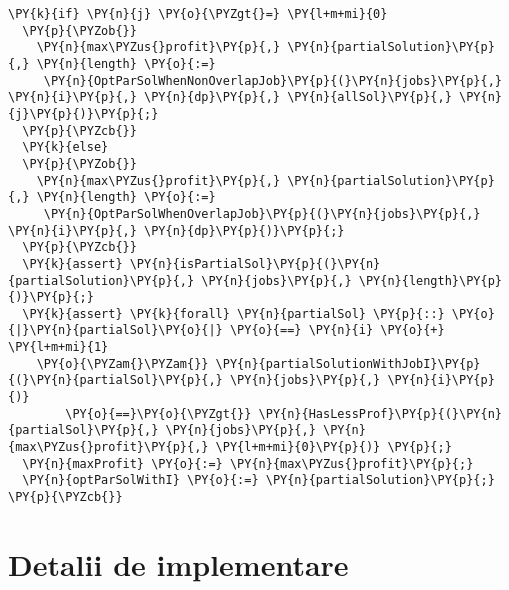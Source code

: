 \begin{Verbatim}[commandchars=\\\{\}, fontsize=\small]
  \PY{k}{if} \PY{n}{j} \PY{o}{\PYZgt{}=} \PY{l+m+mi}{0} 
  \PY{p}{\PYZob{}}
    \PY{n}{max\PYZus{}profit}\PY{p}{,} \PY{n}{partialSolution}\PY{p}{,} \PY{n}{length} \PY{o}{:=}
     \PY{n}{OptParSolWhenNonOverlapJob}\PY{p}{(}\PY{n}{jobs}\PY{p}{,} \PY{n}{i}\PY{p}{,} \PY{n}{dp}\PY{p}{,} \PY{n}{allSol}\PY{p}{,} \PY{n}{j}\PY{p}{)}\PY{p}{;}
  \PY{p}{\PYZcb{}}
  \PY{k}{else}
  \PY{p}{\PYZob{}}
    \PY{n}{max\PYZus{}profit}\PY{p}{,} \PY{n}{partialSolution}\PY{p}{,} \PY{n}{length} \PY{o}{:=}
     \PY{n}{OptParSolWhenOverlapJob}\PY{p}{(}\PY{n}{jobs}\PY{p}{,} \PY{n}{i}\PY{p}{,} \PY{n}{dp}\PY{p}{)}\PY{p}{;}
  \PY{p}{\PYZcb{}}
  \PY{k}{assert} \PY{n}{isPartialSol}\PY{p}{(}\PY{n}{partialSolution}\PY{p}{,} \PY{n}{jobs}\PY{p}{,} \PY{n}{length}\PY{p}{)}\PY{p}{;}
  \PY{k}{assert} \PY{k}{forall} \PY{n}{partialSol} \PY{p}{::} \PY{o}{|}\PY{n}{partialSol}\PY{o}{|} \PY{o}{==} \PY{n}{i} \PY{o}{+} \PY{l+m+mi}{1} 
    \PY{o}{\PYZam{}\PYZam{}} \PY{n}{partialSolutionWithJobI}\PY{p}{(}\PY{n}{partialSol}\PY{p}{,} \PY{n}{jobs}\PY{p}{,} \PY{n}{i}\PY{p}{)}
        \PY{o}{==}\PY{o}{\PYZgt{}} \PY{n}{HasLessProf}\PY{p}{(}\PY{n}{partialSol}\PY{p}{,} \PY{n}{jobs}\PY{p}{,} \PY{n}{max\PYZus{}profit}\PY{p}{,} \PY{l+m+mi}{0}\PY{p}{)} \PY{p}{;}
  \PY{n}{maxProfit} \PY{o}{:=} \PY{n}{max\PYZus{}profit}\PY{p}{;}
  \PY{n}{optParSolWithI} \PY{o}{:=} \PY{n}{partialSolution}\PY{p}{;}
\PY{p}{\PYZcb{}}
\end{Verbatim}



\section{Detalii de implementare}

